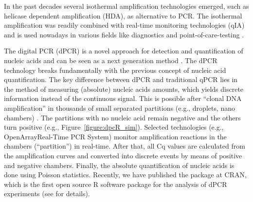 In the past decades several isothermal amplification technologies
emerged, such as helicase 
dependent amplification (HDA), as alternative to PCR. The isothermal 
amplification 
was readily combined with real-time monitoring technologies (qIA) and is used 
nowadays in various fields like diagnostics and point-of-care-testing 
\citep{rodiger_nucleic_2014,nixon_2014}.

The digital PCR (dPCR) is a novel approach for detection and quantification of 
nucleic acids and can be seen as a next generation method 
\citep{huggett_qpcr_2015}. The dPCR technology 
breaks fundamentally with the previous concept of nucleic acid quantification. 
The key difference between dPCR and traditional qPCR lies in the method of 
measuring (absolute) nucleic acids amounts, which yields discrete information 
instead of the continuous signal. This is possible after ``clonal DNA 
amplification'' in thousands of small separated partitions (e.g., droplets, 
nano 
chambers) \citep{huggett_2013, milbury_2014, morley_2014}. The partitions with 
no 
nucleic acid remain negative and the others turn positive (e.g., 
Figure~\ref{figure:dpcR_sim}). Selected technologies (e.g., 
OpenArray\textregistered Real-Time PCR System) monitor amplification reactions 
in the chambers (``partition'') in real-time. After that, all Cq values are 
calculated from the amplification curves and converted into discrete events by 
means of positive and negative chambers. Finally, the absolute quantification 
of 
nucleic acids is done using Poisson statistics. Recently, we have published the 
 package at CRAN, which is the first 
open source R software package for the analysis of dPCR 
experiments (see  for details).

